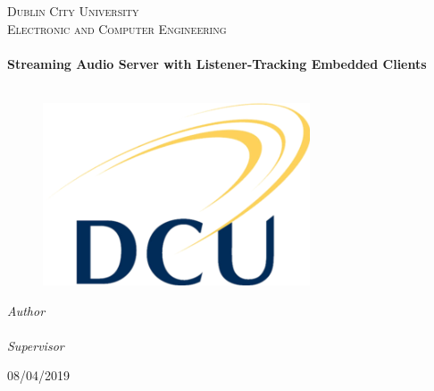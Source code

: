 \begin{titlepage}
  \begin{center}

    \textsc{\LARGE Dublin City University}\\[1.5cm]
    \textsc{\Large Electronic and Computer Engineering}\\[0.5cm]

    \HRule\\[0.4cm]
    {\huge \bfseries Streaming Audio Server with Listener-Tracking Embedded Clients\\[0.4cm]}
    \HRule\\[1.5cm]

    \begin{figure}[H]
	\includegraphics{images/Dcu-logo.png}
	\centering
    \end{figure}

    \emph{Author}\\[0.1cm]
    \noindent{}\\[0.1cm]

    \emph{Supervisor}
    \noindent{}\\[1cm]

    \vfill

      {\large{08/04/2019}}

  \end{center}
\end{titlepage}
